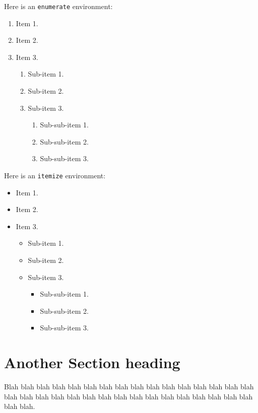 \documentclass[pdfa]{drdc-report}
\begin{document}
Here is an \texttt{enumerate} environment:
\begin{enumerate}
 \item Item 1.
 \item Item 2.
 \item Item 3.
 \begin{enumerate}
   \item Sub-item 1.
   \item Sub-item 2.
   \item Sub-item 3.
   \begin{enumerate}
     \item Sub-sub-item 1.
     \item Sub-sub-item 2.
     \item Sub-sub-item 3.
   \end{enumerate}
 \end{enumerate}
\end{enumerate}

Here is an \texttt{itemize} environment:
\begin{itemize}
 \item Item 1.
 \item Item 2.
 \item Item 3.
 \begin{itemize}
   \item Sub-item 1.
   \item Sub-item 2.
   \item Sub-item 3.
   \begin{itemize}
     \item Sub-sub-item 1.
     \item Sub-sub-item 2.
     \item Sub-sub-item 3.
   \end{itemize}
 \end{itemize}
\end{itemize}

\section{Another Section heading}

Blah blah blah blah blah blah blah blah blah blah blah blah blah blah
blah blah blah blah blah blah blah blah blah blah blah blah blah blah
blah blah blah blah blah blah.

\clearpage


 
\appendix
{}
\end{document}
